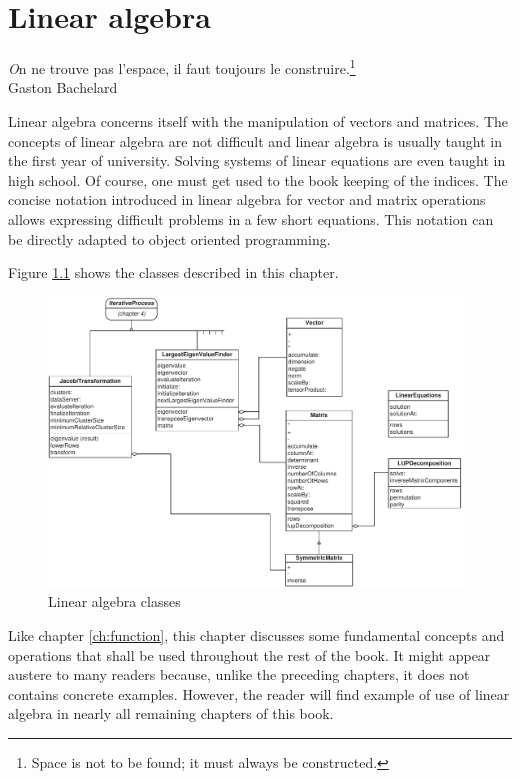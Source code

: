 %
%

\chapter{Linear algebra}
\label{ch:linearalgebra}
\begin{flushright}
{\textsl On ne trouve pas l'espace, il faut toujours le
construire.}\footnote{Space is not to be found; it must always be
constructed.}\\ Gaston Bachelard
\end{flushright}
\vspace{1 ex} Linear algebra concerns itself with the manipulation
of vectors and matrices. The concepts of linear algebra are not
difficult and linear algebra is usually taught in the first year
of university. Solving systems of linear equations are even taught
in high school. Of course, one must get used to the book keeping
of the indices. The concise notation introduced in linear algebra
for vector and matrix operations allows expressing difficult
problems in a few short equations. This notation can be directly
adapted to object oriented programming.

Figure \ref{fig:linearalgebraclasses} shows the classes described
in this chapter.
\begin{figure}
\centering\includegraphics[width=11cm]{Figures/LinearAlgebraClasses}
\caption{Linear algebra classes}\label{fig:linearalgebraclasses}
\end{figure}
Like chapter \ref{ch:function}, this chapter discusses some
fundamental concepts and operations that shall be used throughout
the rest of the book. It might appear austere to many readers
because, unlike the preceding chapters, it does not contains
concrete examples. However, the reader will find example of use of
linear algebra in nearly all remaining chapters of this book.

